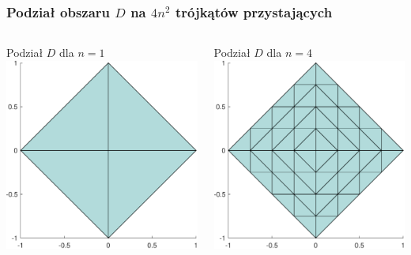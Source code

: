 \documentclass[9pt]{beamer}
\begin{document}
\begin{frame}
\frametitle{Podział obszaru $D$ na $4n^2$ trójkątów przystających}
    \begin{columns}
        \centering
        Podział $D$ dla $n = 1$\\
        \vspace{1em}
        \includegraphics[width=\textwidth]{figure1.pdf}


        \centering
        Podział $D$ dla $n = 4$\\
        \vspace{1em}
        \includegraphics[width=\textwidth]{figure4.pdf}

    \end{columns}
\end{frame}
\end{document}
